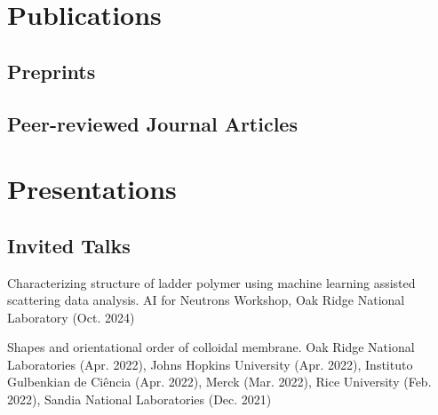 \documentclass[11pt,letterpaper]{article}
\begin{document}
\section*{Publications}

%

\subsection*{Preprints}
\begin{etaremune}
    \item {}
    \item {}
    \item {}
\end{etaremune}

\subsection*{Peer-reviewed Journal Articles}
\begin{etaremune}
    \item {}
    \item {}
    \item {}
    \item {}
    \item {}
    \item {}
\end{etaremune}

\section*{Presentations}

\subsection*{Invited Talks}
\begin{etaremune}
    \item Characterizing structure of ladder polymer using machine learning assisted scattering data analysis. AI for Neutrons Workshop, Oak Ridge National Laboratory (Oct. 2024)
    \item Shapes and orientational order of colloidal membrane. Oak Ridge National Laboratories (Apr. 2022), Johns Hopkins University (Apr. 2022), Instituto Gulbenkian de Ciência (Apr. 2022), Merck (Mar. 2022), Rice University (Feb. 2022), Sandia National Laboratories (Dec. 2021)
\end{etaremune}
\end{document}

